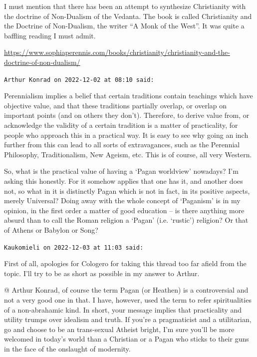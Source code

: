 \begin{footnotesize}
\begin{sffamily}
I must mention that there has been an attempt to synthesize Christianity with the doctrine of Non-Dualism of the Vedanta. The book is called Christianity and the Doctrine of Non-Dualism, the writer “A Monk of the West”. It was quite a baffling reading I must admit.

\url{https://www.sophiaperennis.com/books/christianity/christianity-and-the-doctrine-of-non-dualism/}

\hfill

\texttt{Arthur Konrad on 2022-12-02 at 08:10 said:}

Perennialism implies a belief that certain traditions contain teachings which have objective value, and that these traditions partially overlap, or overlap on important points (and on others they don’t). Therefore, to derive value from, or acknowledge the validity of a certain tradition is a matter of practicality, for people who approach this in a practical way. It is easy to see why going an inch further from this can lead to all sorts of extravagances, such as the Perennial Philosophy, Traditionalism, New Ageism, etc. This is of course, all very Western.

So, what is the practical value of having a ‘Pagan worldview’ nowadays? I’m asking this honestly. For it somehow applies that one has it, and another does not, so what in it is distinctly Pagan which is not in fact, in its positive aspects, merely Universal? Doing away with the whole concept of ‘Paganism’ is in my opinion, in the first order a matter of good education – is there anything more absurd than to call the Roman religion a ‘Pagan’ (i.e. ‘rustic’) religion? Or that of Athens or Babylon or Song?

\hfill

\texttt{Kaukomieli on 2022-12-03 at 11:03 said:}

First of all, apologies for Cologero for taking this thread too far afield from the topic. I’ll try to be as short as possible in my answer to Arthur.

{@} Arthur Konrad, of course the term Pagan (or Heathen) is a controversial and not a very good one in that. I have, however, used the term to refer spiritualities of a non-abrahamic kind. In short, your message implies that practicality and utility trumps over idealism and truth. If you’re a pragmaticist and a utilitarian, go and choose to be an trans-sexual Atheist bright, I’m sure you’ll be more welcomed in today’s world than a Christian or a Pagan who sticks to their guns in the face of the onslaught of modernity.


\end{sffamily}
\end{footnotesize}
